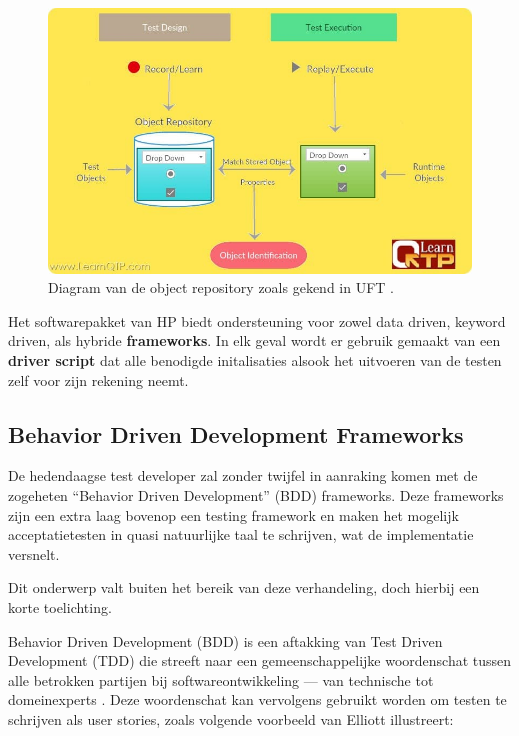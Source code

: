 \begin{figure}[h!]
    \centering
    \includegraphics[scale=0.4]{img/LearnQTP2017GuideToObjectRepositoryInUft.jpg}
    \caption{Diagram van de object repository zoals gekend in UFT \autocite{LearnQTP2017ObjectRepo}.}
    \label{fig:utfobjectrepo}
\end{figure}

Het softwarepakket van HP biedt ondersteuning voor zowel data driven, keyword driven, als hybride \textbf{frameworks}. In elk geval wordt er gebruik gemaakt van een \textbf{driver script} dat alle benodigde initalisaties alsook het uitvoeren van de testen zelf voor zijn rekening neemt. \autocite{TutorialsPointDesigningFramework,TutorialsPointFrameworks,Guru99FrameworksInQTP}

\subsection{Behavior Driven Development Frameworks}

De hedendaagse test developer zal zonder twijfel in aanraking komen met de zogeheten ``Behavior Driven Development'' (BDD) frameworks. Deze frameworks zijn een extra laag bovenop een testing framework en maken het mogelijk acceptatietesten in quasi natuurlijke taal te schrijven, wat de implementatie versnelt. \autocite{Diepenbeck2014}

Dit onderwerp valt buiten het bereik van deze verhandeling, doch hierbij een korte toelichting.

Behavior Driven Development (BDD) is een aftakking van Test Driven Development (TDD) die streeft naar een gemeenschappelijke woordenschat tussen alle betrokken partijen bij softwareontwikkeling — van technische tot domeinexperts \autocite{Elliott2019}. Deze woordenschat kan vervolgens gebruikt worden om testen te schrijven als user stories, zoals volgende voorbeeld van Elliott illustreert:

